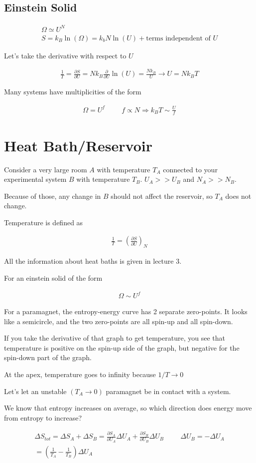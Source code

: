 \documentclass[fleqn]{report}
\newcommand{\hp}{\hspace{1cm}}
\newcommand{\del}{\partial}
\newcommand{\equations} [1] {
\begin{gather*}
#1
\end{gather*}
}
\begin{document}
\subsection{Einstein Solid}
\equations{
    \Omega 
    \simeq 
    U^N 
    \\ 
    S 
    =
    k_B \ln(\Omega)
    =
    k_b N \ln(U)
    +
    \textrm{terms independent of $U$}
}

Let's take the derivative with respect to $U$ 

\equations{
    \frac{1}{T}
    =
    \frac{\del S}{\del U}
    =
    N k_B \frac{\del}{\del U} \ln(U)
    =
    \frac{N k_B}{U}
    \rightarrow 
    U 
    =
    N k_B T 
}

Many systems have multiplicities of the form 
\equations{
    \Omega 
    =
    U^f 
    \hp 
    f 
    \propto 
    N
    \Rightarrow 
    k_B T 
    \sim 
    \frac{U}{f}
}

\section{Heat Bath/Reservoir}
Consider a very large room $A$ with temperature $T_A$ connected to your 
experimental system $B$ with temperature $T_B$. $U_A >> U_B$ and $N_A >> N_B$.
 
Because of those, any change in $B$ should not affect the reservoir, so 
$T_A$ does not change.

Temperature is defined as 
\equations{
    \frac{1}{T}
    =
    \left(
        \frac{\del S}{\del U}
    \right)_N
}

All the information about heat baths is given in lecture 3. 

For an einstein solid of the form 
\equations{
    \Omega 
    \sim 
    U^f
}

For a paramagnet, the entropy-energy curve has 2 separate zero-points. 
It looks like a semicircle, and the two zero-points are all spin-up and 
all spin-down. 

If you take the derivative of that graph to get temperature, you see 
that temperature is positive on the spin-up side of the graph, but 
negative for the spin-down part of the graph. 

At the apex, temperature goes to infinity because $1/T \to 0$ 

Let's let an unstable $(T_A \to 0)$ paramagnet be in contact with a system. 

We know that entropy increases on average, so which direction does 
energy move from entropy to increase?
\equations{
    \Delta S_{tot}
    =
    \Delta S_A
    +
    \Delta S_B 
    =
    \frac{\del S_A}{\del U_A}
    \Delta U_A
    +
    \frac{\del S_B}{\del U_B}
    \Delta U_B
    \hp 
    \Delta U_B = - \Delta U_A 
    \\
    =
    \left(
        \frac{1}{T_A}
        -
        \frac{1}{T_B}
    \right)
    \Delta U_A
}
\end{document}
